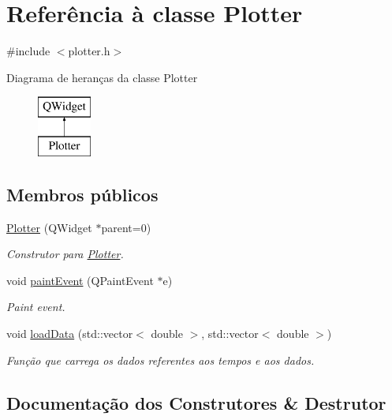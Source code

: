 \hypertarget{class_plotter}{}\section{Referência à classe Plotter}
\label{class_plotter}


{\ttfamily \#include $<$plotter.\+h$>$}

Diagrama de heranças da classe Plotter\begin{figure}[H]
\begin{center}
\leavevmode
\includegraphics[height=2.000000cm]{class_plotter}
\end{center}
\end{figure}
\subsection*{Membros públicos}
\begin{DoxyCompactItemize}
\item 
\hyperlink{class_plotter_a367b6890c36910a27ec710ac3693e64b}{Plotter} (Q\+Widget $\ast$parent=0)
\begin{DoxyCompactList}\small\item\em Construtor para \hyperlink{class_plotter}{Plotter}. \end{DoxyCompactList}\item 
void \hyperlink{class_plotter_ac4341569909943e37e1ff756587e6e12}{paint\+Event} (Q\+Paint\+Event $\ast$e)
\begin{DoxyCompactList}\small\item\em Paint event. \end{DoxyCompactList}\item 
void \hyperlink{class_plotter_ae73b5093b98bbbebd6abdb4e7e7807ed}{load\+Data} (std\+::vector$<$ double $>$, std\+::vector$<$ double $>$)
\begin{DoxyCompactList}\small\item\em Função que carrega os dados referentes aos tempos e aos dados. \end{DoxyCompactList}\end{DoxyCompactItemize}


\subsection{Documentação dos Construtores \& Destrutor}
\mbox{\label{class_plotter_a367b6890c36910a27ec710ac3693e64b}} 
